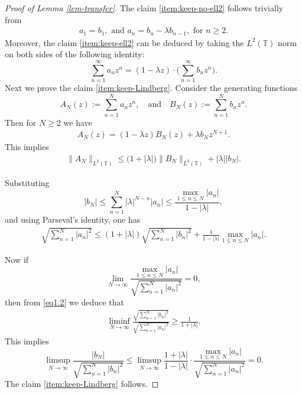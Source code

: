 \documentclass[11pt, reqno]{amsart}
\theoremstyle{definition}
\newtheorem*{Brown-Eagleson Theorem}{The Brown-Eagleson Theorem}
\newcommand{\T}{\mathbb T}
\begin{document}
		\begin{proof}[Proof of Lemma \ref{lem-transfer}]

		The claim \ref{item:keep-no-ell2} follows trivially from
		\begin{align*}
			a_1=b_1,\,\, \text{and} \,\, a_n=b_n-\lambda b_{n-1}, \text{ for }n\geq 2.
		\end{align*}
		Moreover, the claim \ref{item:keep-ell2} can be deduced by taking the $L^2(\T)$ norm on both sides of the following identity:
		$$\sum_{n=1}^\infty a_n z^n = (1-\lambda z) \cdot \bigg( \sum_{n=1}^\infty b_nz^n \bigg).$$
		Next we prove the claim \ref{item:keep-Lindberg}. Consider the generating functions $$A_N(z):=\sum_{n=1}^N a_n z^n,\quad \text{and} \quad B_N(z):=\sum_{n=1}^N b_n z^n.$$
		Then for $N\geq 2$ we have 
		\begin{align*}
			A_N(z)=(1-\lambda z) B_N(z) + \lambda b_Nz^{N+1}.
		\end{align*}
		This implies 
		\begin{align*}
		\big\|A_N \big\|_{L^2(\T)} \leq  \big(1+|\lambda|\big)\big\|B_N \big\|_{L^2(\T)}+|\lambda| |b_N|.
	\end{align*}
	
   Substituting $$|b_N| \leq \sum_{n=1}^N |\lambda|^{N-n} |a_n| \leq  \frac{\max_{1\leq n \leq N} |a_n|}{1-|\lambda|},$$ and using Parseval's identity, one has
	\begin{align}\label{eq1.2}
		\sqrt{\sum_{n=1}^N |a_n|^2} \leq (1+|\lambda|) \sqrt{\sum_{n=1}^N |b_n|^2} + \frac{ \lambda }{1-|\lambda|}\max_{1\leq n \leq N} |a_n|.
	\end{align}
	
	Now if $$\lim_{N\to \infty} \frac{\max_{1\leq n \leq N} |a_n|}{\sqrt{\sum_{n=1}^N |a_n|^2}} = 0,$$ then from \eqref{eq1.2} we deduce that 
	\begin{align}\label{eq-ratio-lower-bound}
		\liminf_{N\to \infty} \frac{\sqrt{\sum_{n=1}^N |b_n|^2}}{\sqrt{\sum_{n=1}^N |a_n|^2}}\geq \frac{1}{1+|\lambda|}.
	\end{align}
	This implies $$\limsup_{N\to \infty} \frac{|b_N|}{\sqrt{\sum_{n=1}^N |b_n|^2}}\leq \limsup_{N\to \infty}\frac{1+|\lambda|}{1-|\lambda|} \cdot \frac{\max_{1\leq n \leq N} |a_n|}{\sqrt{\sum_{n=1}^N |a_n|^2}} =0.$$ The claim \ref{item:keep-Lindberg} follows.
	\end{proof} 
\end{document}
